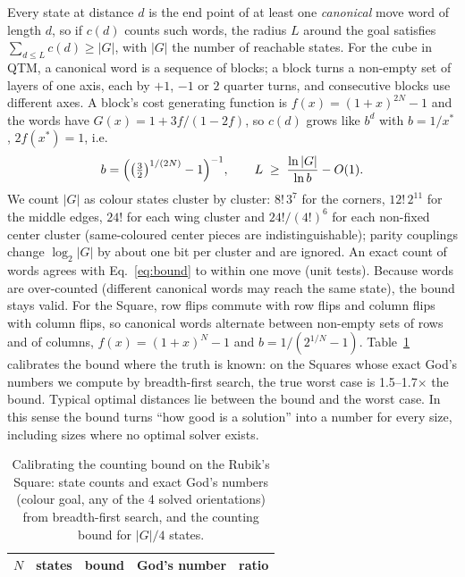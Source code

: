 Every state at distance $d$ is the end point of at least one \emph{canonical} move word of length $d$, so if $c(d)$
counts such words, the radius $L$ around the goal satisfies $\sum_{d\le L}c(d)\ge|G|$, with $|G|$ the number of
reachable states. For the cube in QTM, a canonical word is a sequence of blocks; a block turns a non-empty set of
layers of one axis, each by $+1$, $-1$ or $2$ quarter turns, and consecutive blocks use different axes. A block's
cost generating function is $f(x)=(1+x)^{2N}-1$ and the words have $G(x)=1+3f/(1-2f)$, so $c(d)$ grows like $b^d$ with
$b=1/x^\ast$, $2f(x^\ast)=1$, i.e.
\begin{equation}
b=\Bigl(\bigl(\tfrac32\bigr)^{1/(2N)}-1\Bigr)^{-1},\qquad L\;\ge\;\frac{\ln|G|}{\ln b}-O(1).
\label{eq:bound}
\end{equation}
We count $|G|$ as colour states cluster by cluster: $8!\,3^7$ for the corners, $12!\,2^{11}$ for the middle edges,
$24!$ for each wing cluster and $24!/(4!)^6$ for each non-fixed center cluster (same-coloured center pieces are
indistinguishable); parity couplings change $\log_2|G|$ by about one bit per cluster and are ignored. An exact count of
words agrees with Eq.~\eqref{eq:bound} to within one move (unit tests). Because words are over-counted (different
canonical words may reach the same state), the bound stays valid. For the Square, row flips commute with row flips and
column flips with column flips, so canonical words alternate between non-empty sets of rows and of columns, $f(x)=(1+x)^N-1$
and $b=1/(2^{1/N}-1)$. Table~\ref{tab:cal} calibrates the bound where the truth is known: on the Squares whose exact
God's numbers we compute by breadth-first search, the true worst case is 1.5--1.7$\times$ the bound. Typical optimal
distances lie between the bound and the worst case. In this sense the bound turns ``how good is a solution'' into a
number for every size, including sizes where no optimal solver exists.

\begin{table}[t]
\caption{Calibrating the counting bound on the Rubik's Square: state counts and exact God's numbers (colour goal, any
of the 4 solved orientations) from breadth-first search, and the counting bound for $|G|/4$ states.}
\label{tab:cal}
\small
\begin{tabular}{@{}rrrrr@{}}
\toprule
$N$ & states & bound & God's number & ratio \\
\midrule

\end{tabular}
\end{table}
